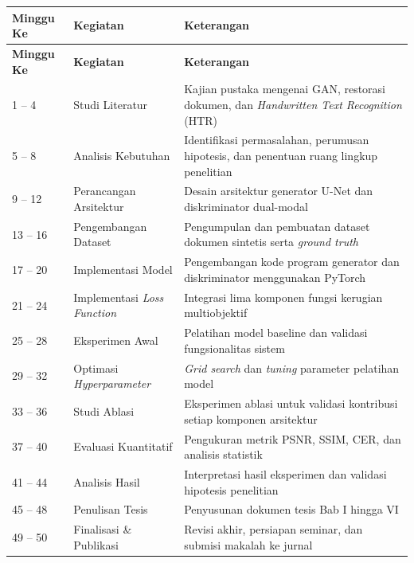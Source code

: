 \documentclass[a4paper,11pt]{article}
\begin{document}
\begin{longtable}{|C{2.5cm}|L{5cm}|L{7cm}|}
\hline
\textbf{Minggu Ke} & \textbf{Kegiatan} & \textbf{Keterangan} \\
\hline
\endfirsthead
\hline
\textbf{Minggu Ke} & \textbf{Kegiatan} & \textbf{Keterangan} \\
\hline
\endhead

1 -- 4 & Studi Literatur & Kajian pustaka mengenai GAN, restorasi dokumen, dan \textit{Handwritten Text Recognition} (HTR) \\
\hline

5 -- 8 & Analisis Kebutuhan & Identifikasi permasalahan, perumusan hipotesis, dan penentuan ruang lingkup penelitian \\
\hline

9 -- 12 & Perancangan Arsitektur & Desain arsitektur generator U-Net dan diskriminator dual-modal \\
\hline

13 -- 16 & Pengembangan Dataset & Pengumpulan dan pembuatan dataset dokumen sintetis serta \textit{ground truth} \\
\hline

17 -- 20 & Implementasi Model & Pengembangan kode program generator dan diskriminator menggunakan PyTorch \\
\hline

21 -- 24 & Implementasi \textit{Loss Function} & Integrasi lima komponen fungsi kerugian multiobjektif \\
\hline

25 -- 28 & Eksperimen Awal & Pelatihan model baseline dan validasi fungsionalitas sistem \\
\hline

29 -- 32 & Optimasi \textit{Hyperparameter} & \textit{Grid search} dan \textit{tuning} parameter pelatihan model \\
\hline

33 -- 36 & Studi Ablasi & Eksperimen ablasi untuk validasi kontribusi setiap komponen arsitektur \\
\hline

37 -- 40 & Evaluasi Kuantitatif & Pengukuran metrik PSNR, SSIM, CER, dan analisis statistik \\
\hline

41 -- 44 & Analisis Hasil & Interpretasi hasil eksperimen dan validasi hipotesis penelitian \\
\hline

45 -- 48 & Penulisan Tesis & Penyusunan dokumen tesis Bab I hingga VI \\
\hline

49 -- 50 & Finalisasi \& Publikasi & Revisi akhir, persiapan seminar, dan submisi makalah ke jurnal \\
\hline

\end{longtable}
\end{document}
